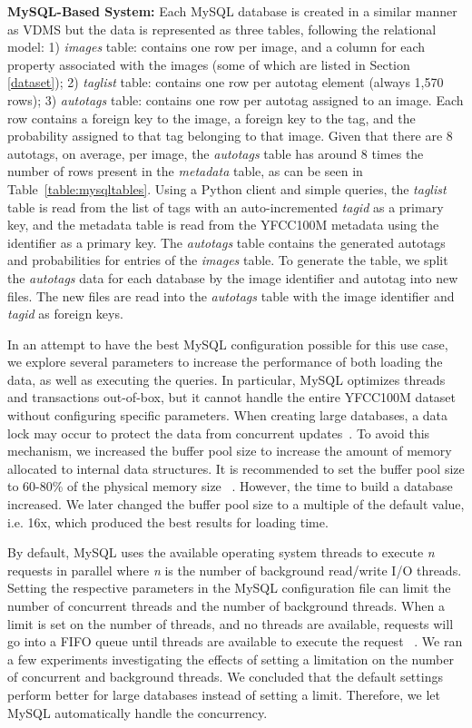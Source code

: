 \textbf{MySQL-Based System:}
Each MySQL database is created in a similar manner as VDMS
but the data is represented as three tables, following the relational model:
1) \textit{images} table: contains one row per image,
and a column for each property
associated with the images (some of which are listed in Section \ref{dataset});
2) \textit{taglist} table: contains one row per autotag element
(always 1,570 rows);
3) \textit{autotags} table: contains one row per autotag
assigned to an image. Each row contains a foreign key to the
image, a foreign key to the tag, and
the probability assigned to that tag belonging to that image.
Given that there are 8 autotags, on average, per image, the \textit{autotags}
table has around 8 times the number of rows present in the
\textit{metadata} table, as can be seen in Table~\ref{table:mysqltables}.
Using a Python client and simple queries, the \textit{taglist}
table is read from the list of tags with an auto-incremented
\textit{tagid} as a primary key, and the metadata table
is read from the YFCC100M metadata using the identifier as a primary key.
The \textit{autotags} table contains the generated autotags and
probabilities for entries of the \textit{images} table.
To generate the table, we split the \textit{autotags} data for each database
by the image identifier and autotag into new files.
The new files are read into the \textit{autotags} table with the image
identifier and \textit{tagid} as foreign keys.

In an attempt to have the best MySQL configuration possible for this use case,
we explore several parameters to increase the performance
of both loading the data, as well as executing the queries.
In particular, MySQL optimizes threads and transactions out-of-box,
but it cannot handle the entire YFCC100M dataset without configuring
specific parameters.
When creating large databases, a data lock may occur to protect the
data from concurrent updates~\cite{mysql_blog}.
To avoid this mechanism, we increased the buffer pool size to
increase the amount of memory allocated to internal data structures.
It is recommended to set the buffer pool size to 60-80\% of the physical
memory size ~\cite{mysql,mysql_blog}.
However, the time to build a database increased.
We later changed  the buffer pool size to a multiple of the default value, i.e. 16x,
which produced the best results for loading time.

By default, MySQL uses the available operating system threads to
execute \textit{n} requests in parallel where \textit{n} is
the number of background read/write I/O threads.
Setting the respective parameters in the MySQL configuration file can limit the
number of concurrent threads and the number of background threads.
When a limit is set on the number of threads, and no threads are available,
requests will go into a FIFO queue until threads are available to execute
the request ~\cite{mysql,mysql_blog}.
We ran a few experiments investigating the effects of setting a limitation on the
number of concurrent and background threads.
We concluded that the default settings perform better for large databases instead of
setting a limit.
Therefore, we let MySQL automatically handle the concurrency.


